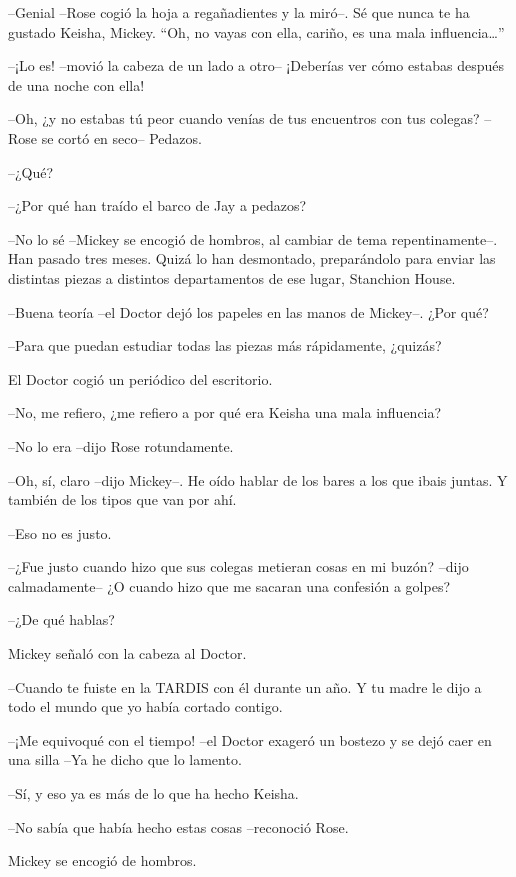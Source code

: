 {--Genial --Rose cogió la hoja a regañadientes y la miró--. Sé que nunca
 te ha gustado Keisha, Mickey. ``Oh, no vayas con ella, cariño, es una
 mala influencia\ldots{}''}

{--¡Lo es! --movió la cabeza de un lado a otro-- ¡Deberías ver cómo
estabas después de una noche con ella!}

{--Oh, ¿y no estabas tú peor cuando venías de tus encuentros con tus
colegas? --Rose se cortó en seco-- Pedazos.}

{--¿Qué?}

{--¿Por qué han traído el barco de Jay a pedazos?}

{--No lo sé --Mickey se encogió de hombros, al cambiar de tema
 repentinamente--. Han pasado tres meses. Quizá lo han desmontado,
 preparándolo para enviar las distintas piezas a distintos departamentos
de ese lugar, Stanchion House.}

{--Buena teoría --el Doctor dejó los papeles en las manos de Mickey--.
¿Por qué?}

{--Para que puedan estudiar todas las piezas más rápidamente, ¿quizás?}

{El Doctor cogió un periódico del escritorio.}

{--No, me refiero, ¿me refiero a por qué era Keisha una mala
influencia?}

{--No lo era --dijo Rose rotundamente.}

{--Oh, sí, claro --dijo Mickey--. He oído hablar de los bares a los que
ibais juntas. Y también de los tipos que van por ahí.}

{--Eso no es justo.}

{--¿Fue justo cuando hizo que sus colegas metieran cosas en mi buzón?
 --dijo calmadamente-- ¿O cuando hizo que me sacaran una confesión a
golpes?}

{--¿De qué hablas?}

{Mickey señaló con la cabeza al Doctor.}

{--Cuando te fuiste en la TARDIS con él durante un año. Y tu madre le
dijo a todo el mundo que yo había cortado contigo.}

{--¡Me equivoqué con el tiempo! --el Doctor exageró un bostezo y se dejó
caer en una silla --Ya he dicho que lo lamento.}

{--Sí, y eso ya es más de lo que ha hecho Keisha.}

{--No sabía que había hecho estas cosas --reconoció Rose.}

{Mickey se encogió de hombros.}

